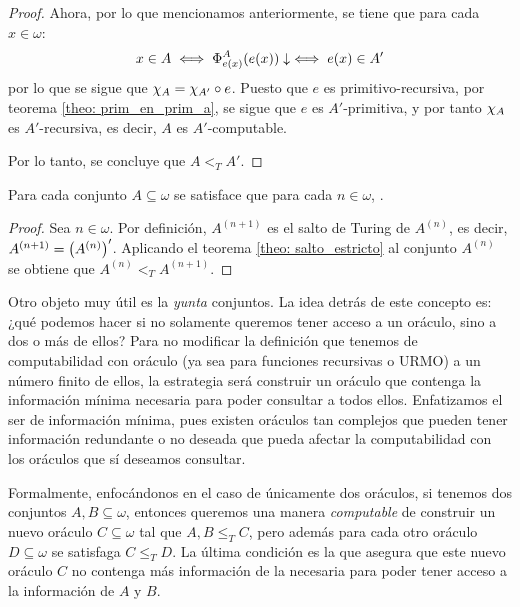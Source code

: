 \begin{agregado}
\begin{proof}
	Ahora, por lo que mencionamos anteriormente, se tiene que para cada $x\in\omega$:
	\[
		x\in A\iff\Phi_{e\pa*{x}}^{A}\pa*{e\pa*{x}}\ACABA\iff e\pa*{x}\in A'
	\]
	por lo que se sigue que $\CARACTERISTICA{A} =\CARACTERISTICA{A'}\circ e$. Puesto que $e$ es primitivo-recursiva, por teorema \ref{theo: prim_en_prim_a}, se sigue que $e$ es $A'$-primitiva, y por tanto $\CARACTERISTICA{A}$ es $A'$-recursiva, es decir, $A$ es $A'$-computable.

	Por lo tanto, se concluye que $A <_{T} A'$.
\end{proof}

\begin{coll}
	\label{coll: jerarquia_saltos}
	Para cada conjunto $A\subseteq\omega$ se satisface que para cada $n\in\omega$, .
\end{coll}

\begin{correccion}
\begin{proof}
	Sea $n\in\omega$. Por definición, $A^{(n + 1)}$ es el salto de Turing de $A^{(n)}$, es decir, $A^{(n + 1)} =\pa*{A^{(n)}}'$. Aplicando el teorema \ref{theo: salto_estricto} al conjunto $A^{(n)}$ se obtiene que $A^{(n)} <_{T} A^{(n + 1)}$.
\end{proof}
\end{correccion}

\begin{agregado}
Otro objeto muy útil es la \emph{yunta}  conjuntos. La idea detrás de este concepto es: ¿qué podemos hacer si no solamente queremos tener acceso a un oráculo, sino a dos o más de ellos? Para no modificar la definición que tenemos de computabilidad con oráculo (ya sea para funciones recursivas o URMO) a un número finito de ellos, la estrategia será construir un oráculo que contenga la información mínima necesaria para poder consultar a todos ellos. Enfatizamos el ser de información mínima, pues existen oráculos tan complejos que pueden tener información redundante o no deseada que pueda afectar la computabilidad con los oráculos que sí deseamos consultar.

Formalmente, enfocándonos en el caso de únicamente dos oráculos, si tenemos dos conjuntos $A, B\subseteq\omega$, entonces queremos una manera \emph{computable} de construir un nuevo oráculo $C\subseteq\omega$ tal que $A, B\leq_{T} C$, pero además para cada otro oráculo $D\subseteq\omega$  se satisfaga $C\leq_{T} D$. La última condición es la que asegura que este nuevo oráculo $C$ no contenga más información de la necesaria para poder tener acceso a la información de $A$ y $B$.


\end{agregado}
\end{agregado}
